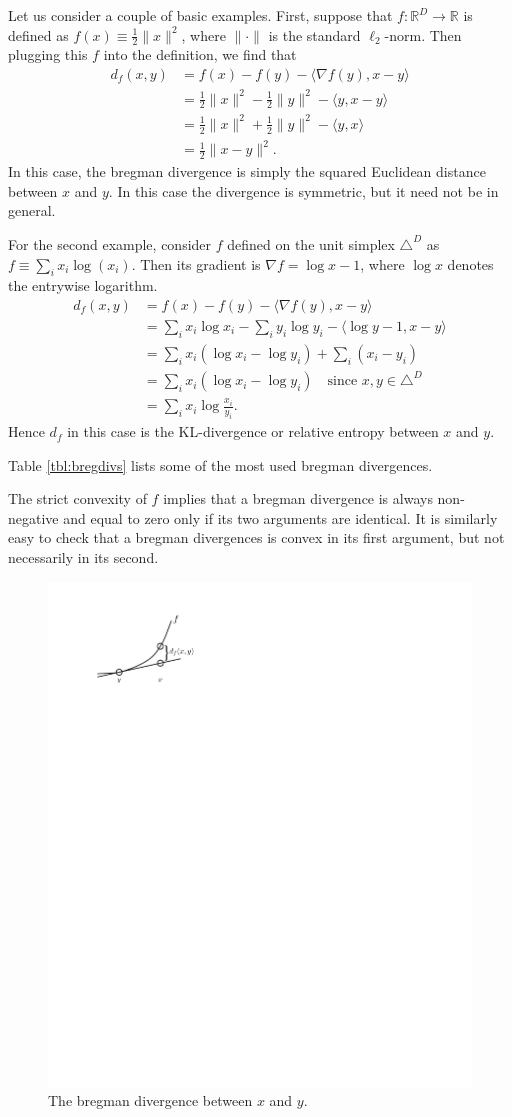 \documentclass{article}
\newcommand{\R}{\mathbb{R}}
\begin{document}
Let us consider a couple of basic examples.  First, suppose that $f:
\R^D \rightarrow \R$ is defined as $f(x) \equiv \frac{1}{2} 
\|x\|^2$, where $\|\cdot\|$ is the standard $\ell_2$-norm.  Then
plugging this $f$ into the definition, we find that  
\begin{align*}
d_f(x,y) &= f(x) - f(y) - \langle \nabla f(y),x-y \rangle \\
&= \frac{1}{2}\|x\|^2 - \frac{1}{2} \|y\|^2 -\langle y, x-y \rangle\\
&= \frac{1}{2}\|x\|^2 + \frac{1}{2} \|y\|^2 -\langle y, x \rangle\\
&= \frac{1}{2}\|x-y\|^2.
\end{align*}
In this case, the bregman divergence is simply the squared Euclidean
distance between $x$ and $y$.  In this case the divergence is
symmetric, but it need not be in general.

For the second example, consider $f$ defined on the unit simplex
$\triangle^D$ as $f\equiv \sum_i x_i\log(x_i)$.  Then its gradient is
$\nabla f = \log{x} -1$, where $\log{x}$ denotes the entrywise
logarithm.  
\begin{align*}
d_f(x,y) &= f(x) - f(y) - \langle \nabla f(y),x-y \rangle \\
&= \sum_i x_i\log{x_i} - \sum_i y_i\log{y_i} - \langle \log{y}-1,x-y
\rangle\\
&= \sum_i x_i\left(\log{x_i} - \log{y_i}\right) + \sum_i (x_i - y_i)\\
&= \sum_i x_i\left(\log{x_i} - \log{y_i}\right) \quad\mbox{since
  $x,y\in \triangle^D$}\\
&= \sum_i x_i\log{\frac{x_i}{y_i}}.  
\end{align*}
Hence $d_f$ in this case is the KL-divergence or relative entropy
between $x$ and $y$. 

Table \ref{tbl:bregdivs} lists some of the most used bregman
divergences.   

The strict convexity of $f$ implies that a bregman divergence is
always non-negative and equal to zero only if its two arguments are
identical.  It is similarly easy to check that a bregman divergences
is convex in its first argument, but not necessarily in its second.  

\begin{figure}
\begin{center}
\includegraphics[width=0.35\linewidth, height=!]{figs/bregDef.pdf}
\caption{The bregman divergence between $x$ and $y$.}
\label{fig:bregDef}
\end{center}
\end{figure}
\end{document}

